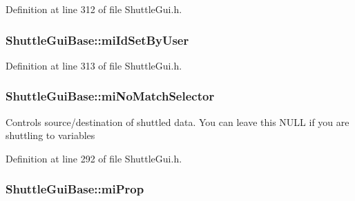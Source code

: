 Definition at line 312 of file Shuttle\+Gui.\+h.

\subsubsection[{\texorpdfstring{mi\+Id\+Set\+By\+User}{miIdSetByUser}}]{ Shuttle\+Gui\+Base\+::mi\+Id\+Set\+By\+User\hspace{0.3cm}{\ttfamily [protected]}}\hypertarget{class_shuttle_gui_base_a7b83dde81ded2ba90c127b32b063d8b8}{}\label{class_shuttle_gui_base_a7b83dde81ded2ba90c127b32b063d8b8}


Definition at line 313 of file Shuttle\+Gui.\+h.

\subsubsection[{\texorpdfstring{mi\+No\+Match\+Selector}{miNoMatchSelector}}]{ Shuttle\+Gui\+Base\+::mi\+No\+Match\+Selector\hspace{0.3cm}{\ttfamily [protected]}}\hypertarget{class_shuttle_gui_base_afc20399d84a16501bad6f69627778474}{}\label{class_shuttle_gui_base_afc20399d84a16501bad6f69627778474}
Controls source/destination of shuttled data. You can leave this N\+U\+LL if you are shuttling to variables 

Definition at line 292 of file Shuttle\+Gui.\+h.

\subsubsection[{\texorpdfstring{mi\+Prop}{miProp}}]{ Shuttle\+Gui\+Base\+::mi\+Prop\hspace{0.3cm}{\ttfamily [protected]}}\hypertarget{class_shuttle_gui_base_a7ffb57d7c3f1aca43e2d3b8357ecd6a5}{}\label{class_shuttle_gui_base_a7ffb57d7c3f1aca43e2d3b8357ecd6a5}



